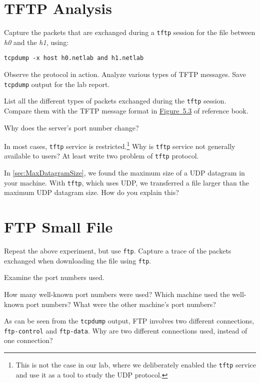 \documentclass{../UTNetLab}
\begin{document}
\section{TFTP Analysis}
    Capture the packets that are exchanged during a \lstinline{tftp} session for the  file between \textit{h0} and the \textit{h1}, using:
    \begin{lstlisting}[emph={h0,h1,netlab},morekeywords={[3]host,and}]
tcpdump -x host h0.netlab and h1.netlab
    \end{lstlisting}
    Observe the protocol in action.
    Analyze various types of TFTP messages.
    Save \lstinline{tcpdump} output for the lab report.
    
    \begin{report}
        \item List all the different types of packets exchanged during the \lstinline{tftp} session.
            Compare them with the TFTP message format in \hyperref[fig:5.3]{Figure~5.3} of reference book.

            Why does the server’s port number change?
        
        \item In most cases, \lstinline{tftp} service is restricted.\footnote{This is not the case in our lab, where we deliberately enabled the \lstinline{tftp} service and use it as a tool to study the UDP protocol.}
        Why is \lstinline{tftp} service not generally available to users? At least write two problem of \lstinline{tftp} protocol.
        
        \item In \autoref{sec:MaxDatagramSize}, we found the maximum size of a UDP datagram in your machine.
    With \lstinline{tftp}, which uses UDP, we transferred a file larger than the maximum UDP datagram size.
        How do you explain this?
    \end{report}

\section{FTP Small File}
    Repeat the above experiment, but use \lstinline{ftp}.
    Capture a trace of the packets exchanged when downloading the  file using \lstinline{ftp}.

    Examine the port numbers used.
    
    \begin{report}
        \item How many well-known port numbers were used?
        Which machine used the well-known port numbers?
        What were the other machine’s port numbers?
        
        \item As can be seen from the \lstinline{tcpdump} output, FTP involves two different connections, \texttt{ftp-control} and \texttt{ftp-data}.
        Why are two different connections used, instead of one connection?
    \end{report}
\end{document}
